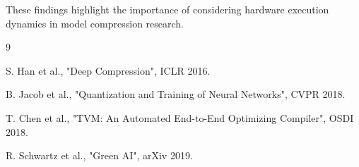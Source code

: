 \documentclass{article}
\begin{document}
These findings highlight the importance of considering hardware execution dynamics in model compression research.

\begin{thebibliography}{9}

S. Han et al.,
"Deep Compression",
ICLR 2016.

B. Jacob et al.,
"Quantization and Training of Neural Networks",
CVPR 2018.

T. Chen et al.,
"TVM: An Automated End-to-End Optimizing Compiler",
OSDI 2018.

R. Schwartz et al.,
"Green AI",
arXiv 2019.

\end{thebibliography}
\end{document}
